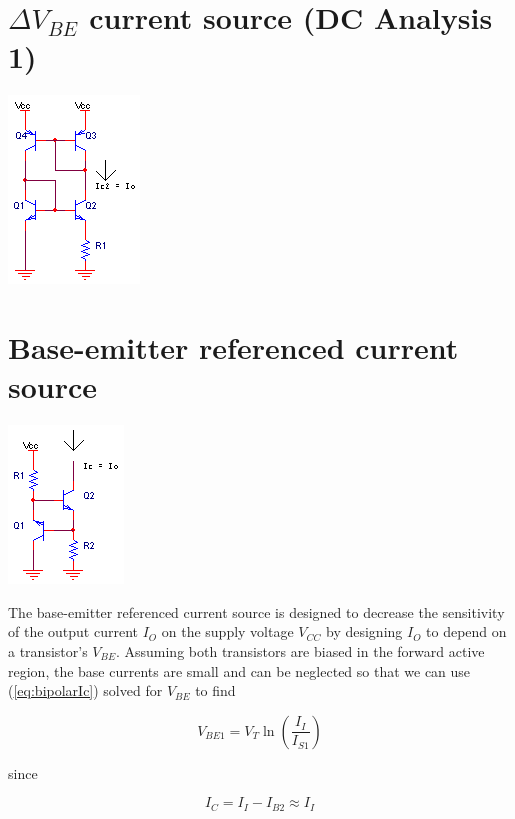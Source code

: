 \section{$\Delta V_{BE}$ current source (DC Analysis 1)}
\begin{center}
	\includegraphics{schematics/deltaVbe_currentsource.PNG}
\end{center}

\section{Base-emitter referenced current source}
\begin{center}
	\includegraphics{schematics/base-emitter_referenced_currentsource.PNG}
\end{center}
The base-emitter referenced current source is designed to decrease the sensitivity of the output current $I_{O}$ on the supply voltage $V_{CC}$ by designing $I_{O}$ to depend on a transistor's $V_{BE}$. Assuming both transistors are biased in the forward active region, the base currents are small and can be neglected so that we can use (\ref{eq:bipolarIc}) solved for $V_{BE}$ to find

\begin{equation}
V_{BE1} = V_{T}\ln\left(\frac{I_{I}}{I_{S1}}\right)
\end{equation}

\noindent since

\begin{equation}
I_{C} = I_{I} - I_{B2} \approx I_{I}
\end{equation}

